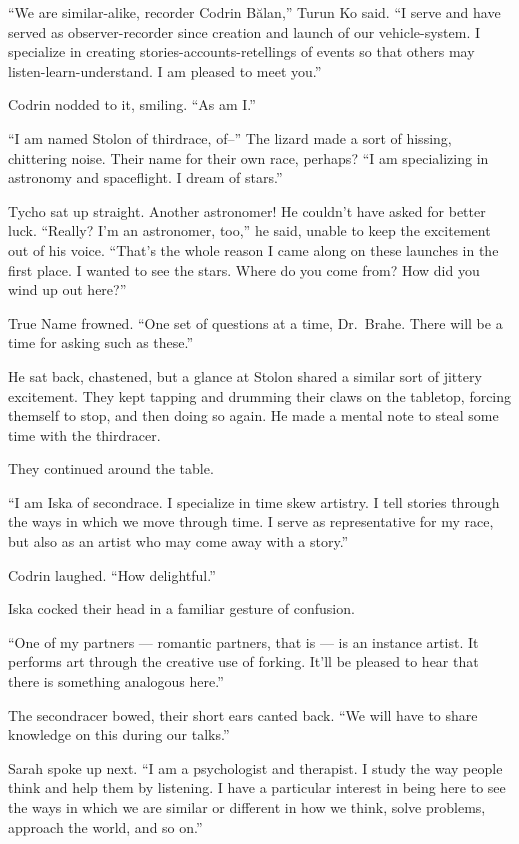 ``We are similar-alike, recorder Codrin Bălan,'' Turun Ko said. ``I serve and have served as observer-recorder since creation and launch of our vehicle-system. I specialize in creating stories-accounts-retellings of events so that others may listen-learn-understand. I am pleased to meet you.''

Codrin nodded to it, smiling. ``As am I.''

``I am named Stolon of thirdrace, of--'' The lizard made a sort of hissing, chittering noise. Their name for their own race, perhaps? ``I am specializing in astronomy and spaceflight. I dream of stars.''

Tycho sat up straight. Another astronomer! He couldn't have asked for better luck. ``Really? I'm an astronomer, too,'' he said, unable to keep the excitement out of his voice. ``That's the whole reason I came along on these launches in the first place. I wanted to see the stars. Where do you come from? How did you wind up out here?''

True Name frowned. ``One set of questions at a time, Dr.~Brahe. There will be a time for asking such as these.''

He sat back, chastened, but a glance at Stolon shared a similar sort of jittery excitement. They kept tapping and drumming their claws on the tabletop, forcing themself to stop, and then doing so again. He made a mental note to steal some time with the thirdracer.

They continued around the table.

``I am Iska of secondrace. I specialize in time skew artistry. I tell stories through the ways in which we move through time. I serve as representative for my race, but also as an artist who may come away with a story.''

Codrin laughed. ``How delightful.''

Iska cocked their head in a familiar gesture of confusion.

``One of my partners — romantic partners, that is — is an instance artist. It performs art through the creative use of forking. It'll be pleased to hear that there is something analogous here.''

The secondracer bowed, their short ears canted back. ``We will have to share knowledge on this during our talks.''

Sarah spoke up next. ``I am a psychologist and therapist. I study the way people think and help them by listening. I have a particular interest in being here to see the ways in which we are similar or different in how we think, solve problems, approach the world, and so on.''

